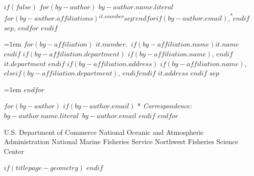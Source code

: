 \begin{minipage}[b][\textheight][s]{\textwidth}
$if(false)$
  $for(by-author)$
    {$by-author.name.literal$}$for(by-author.affiliations)${\textsuperscript{$it.number$}}$sep${\textsuperscript{,}}$endfor$$if(by-author.email)$,{\textsuperscript{*}}$endif$$sep$,
$endfor$
$endif$

\vspace{2\baselineskip}

\hangindent=1em
$for(by-affiliation)$%
{$it.number$}.~$if(by-affiliation.name)${$it.name$}$endif$%
$if(by-affiliation.department)$%
$if(by-affiliation.name)$, $endif$%
{$it.department$}%
$endif$%
$if(by-affiliation.address)$%
$if(by-affiliation.name)$, $else$$if(by-affiliation.department)$, $endif$$endif$%
{$it.address$}%
$endif$%
$sep$\par\hangindent=1em%
$endfor$

\vspace{1\baselineskip}

$for(by-author)$
$if(by-author.email)$
* \textit{Correspondence:}~$by-author.name.literal$~$by-author.email$
$endif$
$endfor$


\vfill


\vspace{1\baselineskip}

U.S. Department of Commerce\newline
National Oceanic and Atmospheric Administration\newline
National Marine Fisheries Service\newline
Northwest Fisheries Science Center\newline

\end{minipage}
$if(titlepage-geometry)$
\restoregeometry
$endif$

